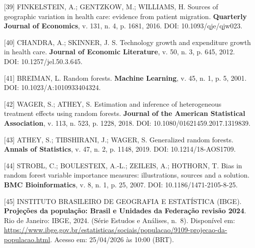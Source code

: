 \documentclass[12pt,a4paper,oneside]{article}
\begin{document}
\begin{singlespace}
\noindent\hangindent=1.25cm\label{ref:finkelstein}
[39] FINKELSTEIN, A.; GENTZKOW, M.; WILLIAMS, H. Sources of
geographic variation in health care: evidence from patient
migration. \textbf{Quarterly Journal of Economics}, v. 131, n. 4,
p. 1681, 2016. DOI: 10.1093/qje/qjw023.
\par\smallskip

\noindent\hangindent=1.25cm\label{ref:chandraskinner}
[40] CHANDRA, A.; SKINNER, J. S. Technology growth and expenditure
growth in health care. \textbf{Journal of Economic Literature},
v. 50, n. 3, p. 645, 2012. DOI: 10.1257/jel.50.3.645.
\par\smallskip

\noindent\hangindent=1.25cm\label{ref:breiman}
[41] BREIMAN, L. Random forests. \textbf{Machine Learning},
v. 45, n. 1, p. 5, 2001. DOI: 10.1023/A:1010933404324.
\par\smallskip

\noindent\hangindent=1.25cm\label{ref:wagerathey}
[42] WAGER, S.; ATHEY, S. Estimation and inference of heterogeneous
treatment effects using random forests. \textbf{Journal of the
American Statistical Association}, v. 113, n. 523,
p. 1228, 2018. DOI: 10.1080/01621459.2017.1319839.
\par\smallskip

\noindent\hangindent=1.25cm\label{ref:atheytibwager}
[43] ATHEY, S.; TIBSHIRANI, J.; WAGER, S. Generalized random
forests. \textbf{Annals of Statistics}, v. 47, n. 2,
p. 1148, 2019. DOI: 10.1214/18-AOS1709.
\par\smallskip

\noindent\hangindent=1.25cm\label{ref:strobl}
[44] STROBL, C.; BOULESTEIX, A.-L.; ZEILEIS, A.; HOTHORN, T. Bias
in random forest variable importance measures: illustrations,
sources and a solution. \textbf{BMC Bioinformatics}, v. 8, n. 1,
p. 25, 2007. DOI: 10.1186/1471-2105-8-25.
\par\smallskip

\noindent\hangindent=1.25cm\label{ref:ibge-projecoes}
[45] INSTITUTO BRASILEIRO DE GEOGRAFIA E ESTAT\'ISTICA (IBGE).
\textbf{Proje\c{c}\~oes da popula\c{c}\~ao: Brasil e Unidades da
Federa\c{c}\~ao \textemdash{} revis\~ao 2024}. Rio de Janeiro:
IBGE, 2024. (S\'erie Estudos e An\'alises, n.\ 8). Dispon\'ivel
em: \url{https://www.ibge.gov.br/estatisticas/sociais/populacao/9109-projecao-da-populacao.html}.
Acesso em: 25/04/2026 \`as 10:00 (BRT).
\par\smallskip


\end{singlespace}
\end{document}
